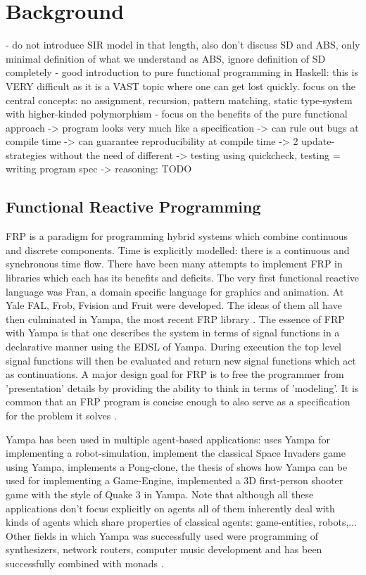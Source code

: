 \section{Background}


- do not introduce SIR model in that length, also don't discuss SD and ABS, only minimal definition of what we understand as ABS, ignore definition of SD completely
- good introduction to pure functional programming in Haskell: this is VERY difficult as it is a VAST topic where one can get lost quickly. focus on the central concepts: no assignment, recursion, pattern matching, static type-system with higher-kinded polymorphism
- focus on the benefits of the pure functional approach
	-> program looks very much like a specification
	-> can rule out bugs at compile time
	-> can guarantee reproducibility at compile time
	-> 2 update-strategies without the need of different
	-> testing using quickcheck, testing = writing program spec
	-> reasoning: TODO

\subsection{Functional Reactive Programming}
FRP is a paradigm for programming hybrid systems which combine continuous and discrete components. Time is explicitly modelled: there is a continuous and synchronous time flow. There have been many attempts to implement FRP in libraries which each has its benefits and deficits. The very first functional reactive language was Fran, a domain specific language for graphics and animation. At Yale FAL, Frob, Fvision and Fruit were developed. The ideas of them all have then culminated in Yampa, the most recent FRP library \cite{nilsson_functional_2002}. The essence of FRP with Yampa is that one describes the system in terms of signal functions in a declarative manner using the EDSL of Yampa. During execution the top level signal functions will then be evaluated and return new signal functions which act as continuations. A major design goal for FRP is to free the programmer from 'presentation' details by providing the ability to think in terms of 'modeling'. It is common that an FRP program is concise enough to also serve as a specification for the problem it solves \cite{wan_functional_2000}.

Yampa has been used in multiple agent-based applications: \cite{hudak_arrows_2003} uses Yampa for implementing a robot-simulation, \cite{courtney_yampa_2003} implement the classical Space Invaders game using Yampa, \cite{nilsson_declarative_2014} implements a Pong-clone, the thesis of \cite{meisinger_game-engine-architektur_2010} shows how Yampa can be used for implementing a Game-Engine, \cite{mun_hon_functional_2005} implemented a 3D first-person shooter game with the style of Quake 3 in Yampa. Note that although all these applications don't focus explicitly on agents all of them inherently deal with kinds of agents which share properties of classical agents: game-entities, robots,... Other fields in which Yampa was successfully used were programming of synthesizers, network routers, computer music development and has been successfully combined with monads \cite{perez_functional_2016}.

